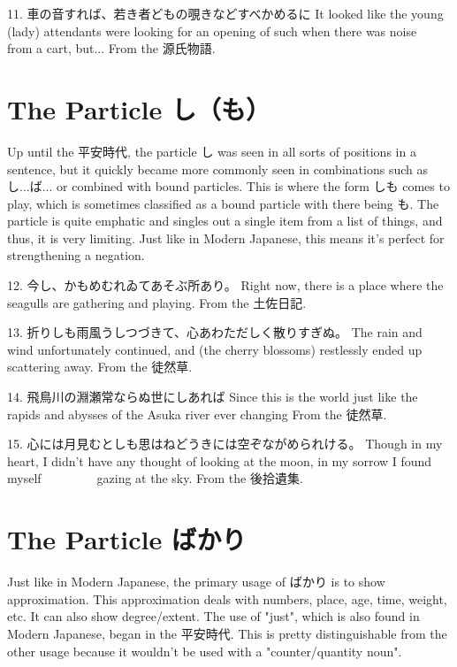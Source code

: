 \par{11. 車の音すれば、若き者どもの覗きなどすべかめるに \hfill\break
It looked like the young (lady) attendants were looking for an opening of such when there was noise       from a cart, but\dothyp{}\dothyp{}\dothyp{} \hfill\break
From the 源氏物語. }
      
\section{The Particle し（も）}
 
\par{ Up until the 平安時代, the particle し was seen in all sorts of positions in a sentence, but it quickly became more commonly seen in combinations such as し\dothyp{}\dothyp{}\dothyp{}ば\dothyp{}\dothyp{}\dothyp{} or combined with bound particles. This is where the form しも comes to play, which is sometimes classified as a bound particle with there being も. The particle is quite emphatic and singles out a single item from a list of things, and thus, it is very limiting. Just like in Modern Japanese, this means it's perfect for strengthening a negation. }

\par{12. 今し、かもめむれゐてあそぶ所あり。 \hfill\break
Right now, there is a place where the seagulls are gathering and playing. \hfill\break
From the 土佐日記. }

\par{13. 折りしも雨風うしつづきて、心あわただしく散りすぎぬ。 \hfill\break
The rain and wind unfortunately continued, and (the cherry blossoms) restlessly ended up scattering away. \hfill\break
From the 徒然草. }

\par{14. 飛鳥川の淵瀬常ならぬ世にしあれば \hfill\break
Since this is the world just like the rapids and abysses of the Asuka river ever changing \hfill\break
From the 徒然草. }

\par{15. 心には月見むとしも思はねどうきには空ぞながめられける。 \hfill\break
Though in my heart, I didn't have any thought of looking at the moon, in my sorrow I found myself           gazing at the sky. \hfill\break
From the 後拾遺集. }
      
\section{The Particle ばかり}
 
\par{ Just like in Modern Japanese, the primary usage of ばかり is to show approximation. This approximation deals with numbers, place, age, time, weight, etc. It can also show degree\slash extent. The use of "just", which is also found in Modern Japanese, began in the 平安時代. This is pretty distinguishable from the other usage because it wouldn't be used with a "counter\slash quantity noun". }

